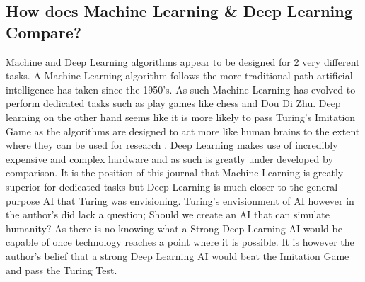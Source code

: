 \documentclass[10pt,a4paper]{scrartcl}
\begin{document}
\begin{multicols}{2}
	\section{How does Machine Learning \& Deep Learning Compare?}
		Machine and Deep Learning algorithms appear to be designed for 2 very different tasks. A Machine Learning algorithm follows the more traditional path artificial intelligence has taken since the 1950's. As such Machine Learning has evolved to perform dedicated tasks such as play games like chess and Dou Di Zhu\cite{SamuelCheckers, ShannonChess, DeepBlue, DouDiZhuMCTS, HearthstoneMCTS}. Deep learning on the other hand seems like it is more likely to pass Turing's Imitation Game\cite{turingComputing} as the algorithms are designed to act more like human brains to the extent where they can be used for research \cite{CrashCourse, DeepLearningSmartwatches, GooglePlayTaipei, huawei}. Deep Learning makes use of incredibly expensive and complex hardware and as such is greatly under developed by comparison. It is the position of this journal that Machine Learning is greatly superior for dedicated tasks but Deep Learning is much closer to the general purpose AI that Turing was envisioning. Turing's envisionment of AI however in the author's did lack a question; Should we create an AI that can simulate humanity? As there is no knowing what a Strong Deep Learning AI would be capable of once technology reaches a point where it is possible. It is however the author's belief that a strong Deep Learning AI would beat the Imitation Game and pass the Turing Test.


	
	
	\newpage
	{}
	
	\end{multicols}
\end{document}

